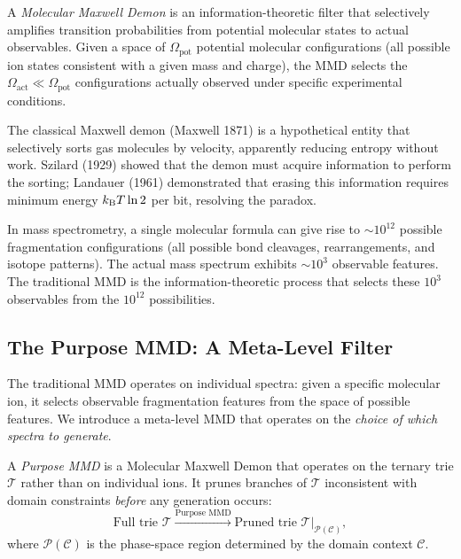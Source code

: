 \begin{definition}
\label{def:ch24-mmd}
A \emph{Molecular Maxwell Demon} is an information-theoretic filter that
selectively amplifies transition probabilities from potential molecular states
to actual observables.  Given a space of $\Omega_{\mathrm{pot}}$ potential
molecular configurations (all possible ion states consistent with a given mass
and charge), the MMD selects the $\Omega_{\mathrm{act}} \ll
\Omega_{\mathrm{pot}}$ configurations actually observed under specific
experimental conditions.
\end{definition}

The classical Maxwell demon (Maxwell 1871) is a hypothetical entity that
selectively sorts gas molecules by velocity, apparently reducing entropy without
work.  Szilard (1929) showed that the demon must acquire information to perform
the sorting; Landauer (1961) demonstrated that erasing this information
requires minimum energy $k_{\mathrm{B}} T \ln 2$ per bit, resolving the paradox.

In mass spectrometry, a single molecular formula can give rise to $\sim 10^{12}$
possible fragmentation configurations (all possible bond cleavages, rearrangements,
and isotope patterns).  The actual mass spectrum exhibits $\sim 10^3$ observable
features.  The traditional MMD is the information-theoretic process that selects
these $10^3$ observables from the $10^{12}$ possibilities.

\subsection{The Purpose MMD: A Meta-Level Filter}
\label{sec:ch24-purpose-mmd}

The traditional MMD operates on individual spectra: given a specific molecular
ion, it selects observable fragmentation features from the space of possible
features.  We introduce a meta-level MMD that operates on the
\emph{choice of which spectra to generate}.

\begin{definition}
\label{def:ch24-purpose-mmd}
A \emph{Purpose MMD} is a Molecular Maxwell Demon that operates on the
ternary trie $\mathcal{T}$ rather than on individual ions.  It prunes branches
of $\mathcal{T}$ inconsistent with domain constraints \emph{before} any
generation occurs:
\begin{equation}
\label{eq:ch24-purpose-mmd}
  \text{Full trie } \mathcal{T}
  \xrightarrow{\text{Purpose MMD}}
  \text{Pruned trie } \mathcal{T}|_{\mathcal{P}(\mathcal{C})},
\end{equation}
where $\mathcal{P}(\mathcal{C})$ is the phase-space region determined by the
domain context $\mathcal{C}$.
\end{definition}

